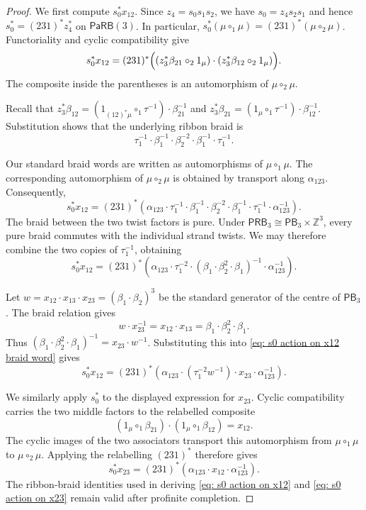\documentclass{amsart}
\newcommand{\PaRB}{\mathsf{PaRB}}
\newcommand{\PB}{\mathsf{PB}} %
\newcommand{\PRB}{\mathsf{PRB}} %
\theoremstyle{definition}
\numberwithin{equation}{section}
\begin{document}
\begin{proof}
We first compute $s_0^*x_{12}$. Since
$z_4=s_0s_1s_2$, we have $s_0=z_4s_2s_1$ and hence
$s_0^*=(231)^*z_4^*$ on $\PaRB(3)$. In particular,
$s_0^*(\mu\circ_1\mu)=(231)^*(\mu\circ_2\mu)$.
Functoriality and cyclic compatibility give
\[
s_0^*x_{12}
=
(231)^*\Bigl(
(z_3^*\beta_{21}\circ_2 1_\mu)
\cdot
(z_3^*\beta_{12}\circ_2 1_\mu)
\Bigr).
\]
The composite inside the parentheses is an automorphism of
$\mu\circ_2\mu$.

Recall that
$z_3^*\beta_{12}
=(1_{(12)^*\mu}\circ_1\tau^{-1})\cdot\beta_{21}^{-1}$
and
$z_3^*\beta_{21}
=(1_\mu\circ_1\tau^{-1})\cdot\beta_{12}^{-1}$.
Substitution shows that the underlying ribbon braid is
\[
\tau_1^{-1}\cdot\beta_1^{-1}\cdot\beta_2^{-2}
\cdot\beta_1^{-1}\cdot\tau_1^{-1}.
\]

Our standard braid words are written as automorphisms of
$\mu\circ_1\mu$. The corresponding automorphism of
$\mu\circ_2\mu$ is obtained by transport along $\alpha_{123}$.
Consequently,
\[
s_0^*x_{12}
=
(231)^*\left(
\alpha_{123}\cdot\tau_1^{-1}
\cdot\beta_1^{-1}\cdot\beta_2^{-2}\cdot\beta_1^{-1}
\cdot\tau_1^{-1}\cdot\alpha_{123}^{-1}
\right).
\]
The braid between the two twist factors is pure. Under
$\PRB_3\cong\PB_3\times\mathbb Z^3$, every pure braid commutes with
the individual strand twists. We may therefore combine the two
copies of $\tau_1^{-1}$, obtaining
\begin{equation}
\label{eq: s0 action on x12 braid word}
s_0^*x_{12}
=
(231)^*\left(
\alpha_{123}\cdot\tau_1^{-2}\cdot
(\beta_1\cdot\beta_2^2\cdot\beta_1)^{-1}
\cdot\alpha_{123}^{-1}
\right).
\end{equation}

Let
$w=x_{12}\cdot x_{13}\cdot x_{23}
=(\beta_1\cdot\beta_2)^3$
be the standard generator of the centre of $\PB_3$. The braid
relation gives
\[
w\cdot x_{23}^{-1}
=
x_{12}\cdot x_{13}
=
\beta_1\cdot\beta_2^2\cdot\beta_1.
\]
Thus
$(\beta_1\cdot\beta_2^2\cdot\beta_1)^{-1}
=x_{23}\cdot w^{-1}$.
Substituting this into
\eqref{eq: s0 action on x12 braid word} gives
\begin{equation}
\label{eq: s0 action on x12}
s_0^*x_{12}
=
(231)^*\left(
\alpha_{123}\cdot
(\tau_1^{-2}w^{-1})\cdot x_{23}
\cdot\alpha_{123}^{-1}
\right).
\end{equation}

We similarly apply $s_0^*$ to the displayed expression for $x_{23}$.
Cyclic compatibility carries the two middle factors to the
relabelled composite
\[
(1_\mu\circ_1\beta_{21})
\cdot(1_\mu\circ_1\beta_{12})
=
x_{12}.
\]
The cyclic images of the two associators transport this automorphism
from $\mu\circ_1\mu$ to $\mu\circ_2\mu$. Applying the relabelling
$(231)^*$ therefore gives
\begin{equation}
\label{eq: s0 action on x23}
s_0^*x_{23}
=
(231)^*\left(
\alpha_{123}\cdot x_{12}\cdot\alpha_{123}^{-1}
\right).
\end{equation}
The ribbon-braid identities used in deriving
\eqref{eq: s0 action on x12} and
\eqref{eq: s0 action on x23} remain valid after profinite completion.


\end{proof}
\end{document}

